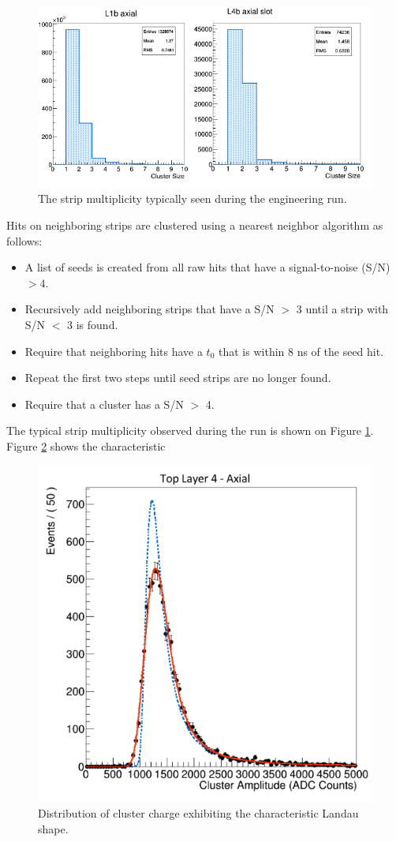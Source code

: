 \begin{figure}[h!t]
    \centering
    \includegraphics[width=\textwidth]{images/cluster_size.png}
    \caption{The strip multiplicity typically seen during the engineering run.}
    \label{fig:strip_mult}
\end{figure}  
Hits on neighboring strips are clustered using a nearest neighbor
algorithm as follows: 
\begin{itemize}
    \item A list of seeds is created from all raw hits that have a signal-to-noise (S/N)
          $>4$.
    \item Recursively add neighboring strips that have a S/N $>$ 3 until a strip with
          S/N $<$ 3 is found.
      \item Require that neighboring hits have a $t_{0}$ that is within 8 ns of the seed hit.
    \item Repeat the first two steps until seed strips are no longer found.
    \item Require that a cluster has a S/N $>$ 4.
\end{itemize}
The typical strip multiplicity observed during the run is shown on Figure 
\ref{fig:strip_mult}. Figure \ref{fig:cluster_charge} shows the characteristic
\begin{figure}[h!t]
    \centering
    \includegraphics[width=.7\textwidth]{images/top_layer4_axial_cluster_charge.png}
    \caption{Distribution of cluster charge exhibiting the characteristic Landau
             shape.}
    \label{fig:cluster_charge}
\end{figure}  
